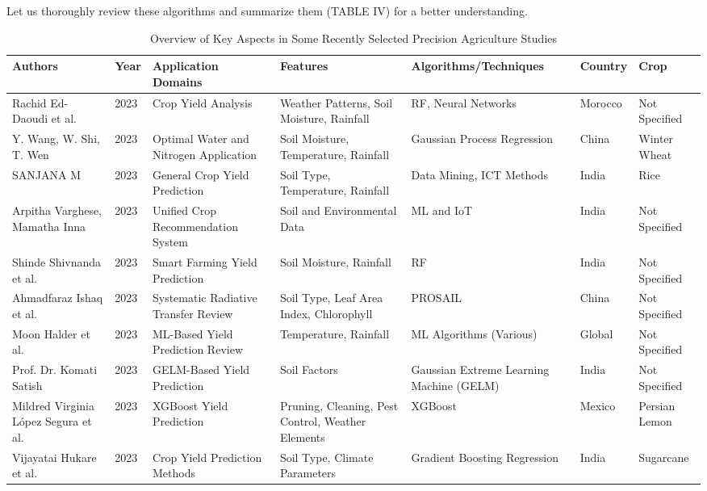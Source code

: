 \documentclass[conference]{IEEEtran}
\begin{document}
Let us thoroughly review these algorithms and summarize them (TABLE IV) for a better understanding.

\begin{table}[htbp]
\centering
\caption{Overview of Key Aspects in Some Recently Selected Precision Agriculture Studies}
\begin{adjustbox}{width=\textwidth}
\begin{tabular}{|p{3cm}|p{1cm}|p{3cm}|p{3cm}|p{3cm}|p{1cm}|p{2cm}|}
\hline
\textbf{Authors} & \textbf{Year} & \textbf{Application Domains} & \textbf{Features} & \textbf{Algorithms/Techniques} & \textbf{Country} & \textbf{Crop}\\
\hline
Rachid Ed-Daoudi et al. & 2023 & Crop Yield Analysis & Weather Patterns, Soil Moisture, Rainfall & RF, Neural Networks & Morocco & Not Specified \\
\hline
Y. Wang, W. Shi, T. Wen & 2023 & Optimal Water and Nitrogen Application & Soil Moisture, Temperature, Rainfall & Gaussian Process Regression & China  & Winter Wheat\\
\hline
SANJANA M & 2023 & General Crop Yield Prediction & Soil Type, Temperature, Rainfall & Data Mining, ICT Methods & India & Rice \\
\hline
Arpitha Varghese, Mamatha Inna & 2023 & Unified Crop Recommendation System & Soil and Environmental Data & ML and IoT & India & Not Specified\\
\hline
Shinde Shivnanda et al. & 2023 & Smart Farming Yield Prediction & Soil Moisture, Rainfall & RF & India & Not Specified\\
\hline
Ahmadfaraz Ishaq et al. & 2023 & Systematic Radiative Transfer Review & Soil Type, Leaf Area Index, Chlorophyll & PROSAIL & China & Not Specified\\
\hline
Moon Halder et al. & 2023 & ML-Based Yield Prediction Review & Temperature, Rainfall & ML Algorithms (Various) & Global & Not Specified\\
\hline
Prof. Dr. Komati Satish & 2023 & GELM-Based Yield Prediction & Soil Factors & Gaussian Extreme Learning Machine (GELM) & India & Not Specified\\
\hline
Mildred Virginia López Segura et al. & 2023 & XGBoost Yield Prediction & Pruning, Cleaning, Pest Control, Weather Elements & XGBoost & Mexico & Persian Lemon\\
\hline
Vijayatai Hukare et al. & 2023 & Crop Yield Prediction Methods & Soil Type, Climate Parameters & Gradient Boosting Regression & India & Sugarcane\\

\end{tabular}
\end{adjustbox}
\end{table}
\end{document}
